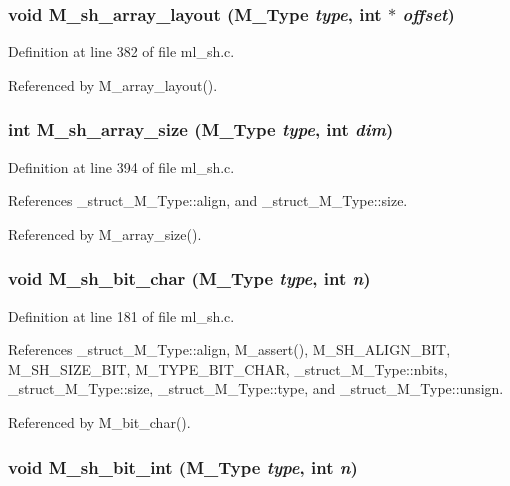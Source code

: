 \subsubsection{\setlength{\rightskip}{0pt plus 5cm}void M\_\-sh\_\-array\_\-layout (\bf{M\_\-Type} {\em type}, int $\ast$ {\em offset})}\label{ml__sh_8c_95f29e34821a94e543b2e09572eb90cd}




Definition at line 382 of file ml\_\-sh.c.

Referenced by M\_\-array\_\-layout().
\subsubsection{\setlength{\rightskip}{0pt plus 5cm}int M\_\-sh\_\-array\_\-size (\bf{M\_\-Type} {\em type}, int {\em dim})}\label{ml__sh_8c_f2e85f083ef84514b3728d9daab2af20}




Definition at line 394 of file ml\_\-sh.c.

References \_\-struct\_\-M\_\-Type::align, and \_\-struct\_\-M\_\-Type::size.

Referenced by M\_\-array\_\-size().
\subsubsection{\setlength{\rightskip}{0pt plus 5cm}void M\_\-sh\_\-bit\_\-char (\bf{M\_\-Type} {\em type}, int {\em n})}\label{ml__sh_8c_a7e1e7a635253b088f131522efb56442}




Definition at line 181 of file ml\_\-sh.c.

References \_\-struct\_\-M\_\-Type::align, M\_\-assert(), M\_\-SH\_\-ALIGN\_\-BIT, M\_\-SH\_\-SIZE\_\-BIT, M\_\-TYPE\_\-BIT\_\-CHAR, \_\-struct\_\-M\_\-Type::nbits, \_\-struct\_\-M\_\-Type::size, \_\-struct\_\-M\_\-Type::type, and \_\-struct\_\-M\_\-Type::unsign.

Referenced by M\_\-bit\_\-char().
\subsubsection{\setlength{\rightskip}{0pt plus 5cm}void M\_\-sh\_\-bit\_\-int (\bf{M\_\-Type} {\em type}, int {\em n})}\label{ml__sh_8c_5b1c167235d1da910fe5061cdfc7c946}




